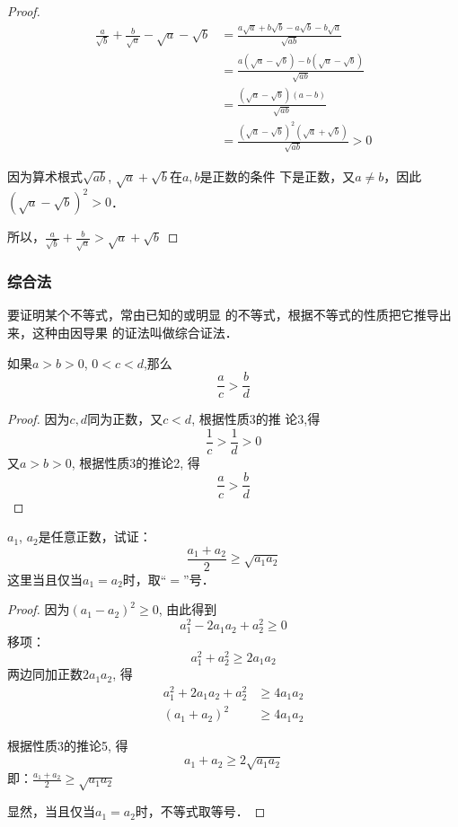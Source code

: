 \begin{proof}
\[\begin{split}
     \frac{a}{\sqrt{b}}+\frac{b}{\sqrt{a}}-\sqrt{a}-\sqrt{b}
    &=\frac{a\sqrt{a}+b\sqrt{b}-a\sqrt{b}-b\sqrt{a}}{\sqrt{ab}}\\
    &=\frac{a\left(\sqrt{a}-\sqrt{b}\right)-b\left(\sqrt{a}-\sqrt{b}\right)}{\sqrt{ab}}\\
    &=\frac{\left(\sqrt{a}-\sqrt{b}\right)(a-b)}{\sqrt{ab}}\\
    &=\frac{\left(\sqrt{a}-\sqrt{b}\right)^2\left(\sqrt{a}+\sqrt{b}\right)}{\sqrt{ab}}>0
\end{split}\]

因为算术根式$\sqrt{ab}$, $\sqrt{a}+\sqrt{b}$在$a,b$是正数的条件
下是正数，又$a\ne b$，因此$\left(\sqrt{a}-\sqrt{b}\right)^2>0$．

所以，$\frac{a}{\sqrt{b}}+\frac{b}{\sqrt{a}}>\sqrt{a}+\sqrt{b}$
\end{proof}

\subsubsection{综合法}
要证明某个不等式，常由已知的或明显
的不等式，根据不等式的性质把它推导出来，这种由因导果
的证法叫做综合证法．
\begin{example}
    如果$a>b>0$, $0<c<d$,那么
    \begin{equation}
        \frac{a}{c}>\frac{b}{d}
    \end{equation}
\end{example}

\begin{proof}
 因为$c,d$同为正数，又$c<d$, 根据性质3的推
论3,得\[\frac{1}{c}>\frac{1}{d}>0\]
又$a>b>0$,
根据性质3的推论2, 得   
\[\frac{a}{c}>\frac{b}{d}\]
\end{proof}
    
\begin{example}
    $a_1$, $a_2$是任意正数，试证：
\begin{equation}
    \frac{a_1+a_2}{2}\ge \sqrt{a_1a_2}
\end{equation}
这里当且仅当$a_1=a_2$时，取“$=$”号．
\end{example}

\begin{proof}
    因为$(a_1-a_2)^2\ge 0$, 由此得到
\[a_1^2-2a_1a_2+a_2^2\ge 0\]
移项：
\[a^2_1+a^2_2\ge 2a_1a_2\]
两边同加正数$2a_1a_2$, 得
\[\begin{split}
    a_1^2+2a_1a_2+a^2_2&\ge 4a_1a_2\\
(a_1+a_2)^2&\ge 4a_1a_2
\end{split}\]

根据性质3的推论5, 得
\[a_1+a_2\ge 2\sqrt{a_1a_2}\]
即：$\frac{a_1+a_2}{2}\ge \sqrt{a_1a_2}$

显然，当且仅当$a_1=a_2$时，不等式取等号．
\end{proof}

